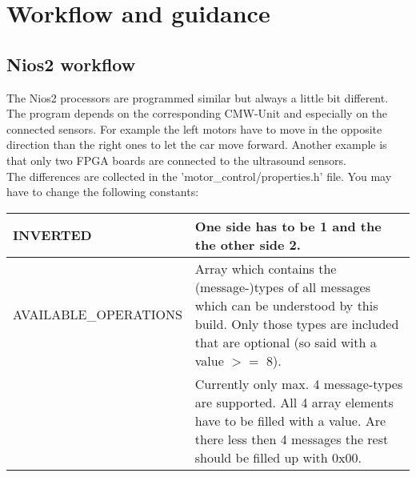 \section{Workflow and guidance}

\subsection{Nios2 workflow}

The Nios2 processors are programmed similar but always a little bit different. The program depends on the corresponding CMW-Unit and especially on the connected sensors. For example the left motors have to move in the opposite direction than the right ones to let the car move forward. Another example is that only two FPGA boards are connected to the ultrasound sensors.\\

The differences are collected in the 'motor\_control/properties.h' file. You may have to change the following constants:\\

\begin{tabular}{l | p{11.75cm}}
INVERTED & One side has to be 1 and the the other side 2.\\ \hline
AVAILABLE\_OPERATIONS & Array which contains the (message-)types of all messages which can be understood by this build. Only those types are included that are optional (so said with a value $>=$ 8). \\
 & Currently only max. 4 message-types are supported. All 4 array elements have to be filled with a value. Are there less then 4 messages the rest should be filled up with 0x00.
\end{tabular}

